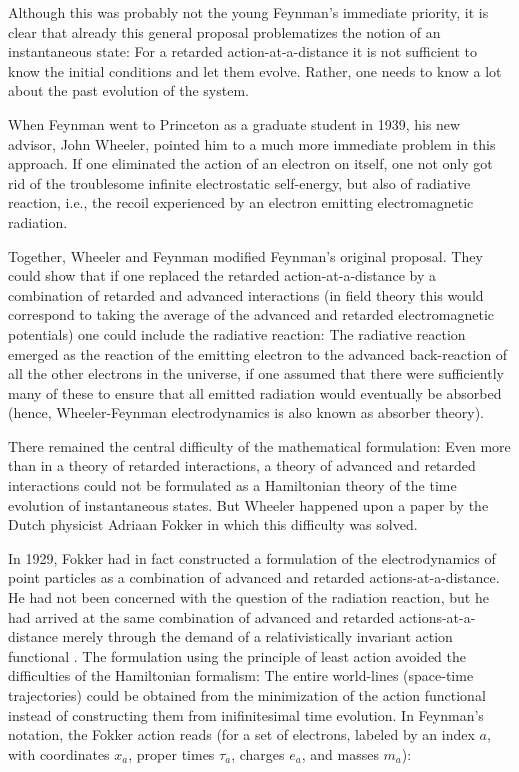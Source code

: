\documentclass[12pt]{article}
\begin{document}
Although this was probably not the young Feynman's immediate priority, it is clear that already this general proposal problematizes the notion of an instantaneous state: For a retarded action-at-a-distance it is not sufficient to know the initial conditions and let them evolve. Rather, one needs to know a lot about the past evolution of the system. 

When Feynman went to Princeton as a graduate student in 1939, his new advisor, John Wheeler, pointed him to a much more immediate problem in this approach. If one eliminated the action of an electron on itself, one not only got rid of the troublesome infinite electrostatic self-energy, but also of radiative reaction, i.e., the recoil experienced by an electron emitting electromagnetic radiation.

Together, Wheeler and Feynman modified Feynman's original proposal. They could show that if one replaced the retarded action-at-a-distance by a combination of retarded and advanced interactions (in field theory this would correspond to taking the average of the advanced and retarded electromagnetic potentials) one could include the radiative reaction: The radiative reaction emerged as the reaction of the emitting electron to the advanced back-reaction of all the other electrons in the universe, if one assumed that there were sufficiently many of these to ensure that all emitted radiation would eventually be absorbed (hence, Wheeler-Feynman electrodynamics is also known as absorber theory).

There remained the central difficulty of the mathematical formulation: Even more than in a theory of retarded interactions, a theory of advanced and retarded interactions could not be formulated as a Hamiltonian theory of the time evolution of instantaneous states. But Wheeler happened upon a paper by the Dutch physicist Adriaan Fokker in which this difficulty was solved.

In 1929, Fokker had in fact constructed a formulation of the electrodynamics of point particles as a combination of advanced and retarded actions-at-a-distance. He had not been concerned with the question of the radiation reaction, but he had arrived at the same combination of advanced and retarded actions-at-a-distance merely through the demand of a relativistically invariant action functional \citep{fokker_1929_wederkeerigheid}. The formulation using the principle of least action avoided the difficulties of the Hamiltonian formalism: The entire world-lines (space-time trajectories) could be obtained from the minimization of the action functional instead of constructing them from inifinitesimal time evolution. In Feynman's notation, the Fokker action reads (for a set of electrons, labeled by an index $a$, with coordinates $x_a$, proper times $\tau_a$, charges $e_a$, and masses $m_a$):
\end{document}

